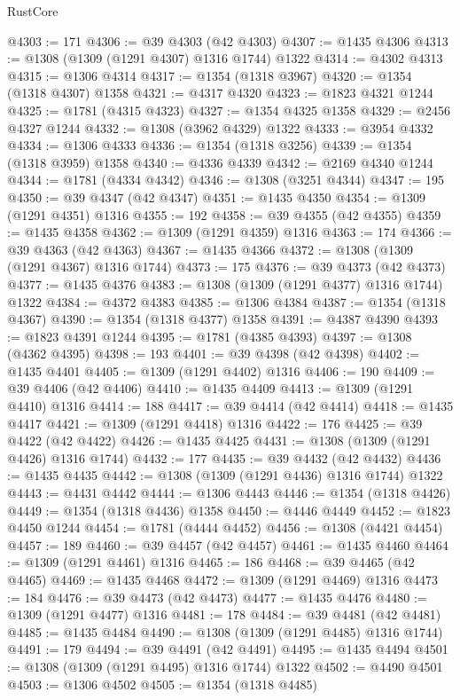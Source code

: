 \begin{lexlean}{RustCore}
\begin{coremodule}
@4303 := 171
@4306 := @39 @4303 (@42 @4303)
@4307 := @1435 @4306
@4313 := @1308 (@1309 (@1291 @4307) @1316 @1744) @1322
@4314 := @4302 @4313
@4315 := @1306 @4314
@4317 := @1354 (@1318 @3967)
@4320 := @1354 (@1318 @4307) @1358
@4321 := @4317 @4320
@4323 := @1823 @4321 @1244
@4325 := @1781 (@4315 @4323)
@4327 := @1354 @4325 @1358
@4329 := @2456 @4327 @1244
@4332 := @1308 (@3962 @4329) @1322
@4333 := @3954 @4332
@4334 := @1306 @4333
@4336 := @1354 (@1318 @3256)
@4339 := @1354 (@1318 @3959) @1358
@4340 := @4336 @4339
@4342 := @2169 @4340 @1244
@4344 := @1781 (@4334 @4342)
@4346 := @1308 (@3251 @4344)
@4347 := 195
@4350 := @39 @4347 (@42 @4347)
@4351 := @1435 @4350
@4354 := @1309 (@1291 @4351) @1316
@4355 := 192
@4358 := @39 @4355 (@42 @4355)
@4359 := @1435 @4358
@4362 := @1309 (@1291 @4359) @1316
@4363 := 174
@4366 := @39 @4363 (@42 @4363)
@4367 := @1435 @4366
@4372 := @1308 (@1309 (@1291 @4367) @1316 @1744)
@4373 := 175
@4376 := @39 @4373 (@42 @4373)
@4377 := @1435 @4376
@4383 := @1308 (@1309 (@1291 @4377) @1316 @1744) @1322
@4384 := @4372 @4383
@4385 := @1306 @4384
@4387 := @1354 (@1318 @4367)
@4390 := @1354 (@1318 @4377) @1358
@4391 := @4387 @4390
@4393 := @1823 @4391 @1244
@4395 := @1781 (@4385 @4393)
@4397 := @1308 (@4362 @4395)
@4398 := 193
@4401 := @39 @4398 (@42 @4398)
@4402 := @1435 @4401
@4405 := @1309 (@1291 @4402) @1316
@4406 := 190
@4409 := @39 @4406 (@42 @4406)
@4410 := @1435 @4409
@4413 := @1309 (@1291 @4410) @1316
@4414 := 188
@4417 := @39 @4414 (@42 @4414)
@4418 := @1435 @4417
@4421 := @1309 (@1291 @4418) @1316
@4422 := 176
@4425 := @39 @4422 (@42 @4422)
@4426 := @1435 @4425
@4431 := @1308 (@1309 (@1291 @4426) @1316 @1744)
@4432 := 177
@4435 := @39 @4432 (@42 @4432)
@4436 := @1435 @4435
@4442 := @1308 (@1309 (@1291 @4436) @1316 @1744) @1322
@4443 := @4431 @4442
@4444 := @1306 @4443
@4446 := @1354 (@1318 @4426)
@4449 := @1354 (@1318 @4436) @1358
@4450 := @4446 @4449
@4452 := @1823 @4450 @1244
@4454 := @1781 (@4444 @4452)
@4456 := @1308 (@4421 @4454)
@4457 := 189
@4460 := @39 @4457 (@42 @4457)
@4461 := @1435 @4460
@4464 := @1309 (@1291 @4461) @1316
@4465 := 186
@4468 := @39 @4465 (@42 @4465)
@4469 := @1435 @4468
@4472 := @1309 (@1291 @4469) @1316
@4473 := 184
@4476 := @39 @4473 (@42 @4473)
@4477 := @1435 @4476
@4480 := @1309 (@1291 @4477) @1316
@4481 := 178
@4484 := @39 @4481 (@42 @4481)
@4485 := @1435 @4484
@4490 := @1308 (@1309 (@1291 @4485) @1316 @1744)
@4491 := 179
@4494 := @39 @4491 (@42 @4491)
@4495 := @1435 @4494
@4501 := @1308 (@1309 (@1291 @4495) @1316 @1744) @1322
@4502 := @4490 @4501
@4503 := @1306 @4502
@4505 := @1354 (@1318 @4485)

\end{coremodule}
\end{lexlean}
